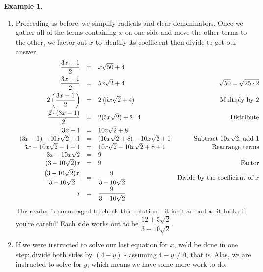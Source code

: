 \documentclass[11pt]{article}
\theoremstyle{definition}  %
\newtheorem{ex}{\bf Example}[section]
\begin{document}
\begin{ex}
\begin{enumerate}
\item  Proceeding as before, we simplify radicals and clear denominators.  Once we gather all of the terms containing $x$ on one side and move the other terms to the other, we factor out $x$ to identify its coefficient then divide to get our answer.\[ \begin{array}{rclr}

\dfrac{3x-1}{2} & = &  x\sqrt{50} + 4 & \\ [8pt]

\dfrac{3x-1}{2} & = &  5x\sqrt{2} + 4 & \text{$\sqrt{50} = \sqrt{25 \cdot 2}$} \\ [8pt]

2\left(\dfrac{3x-1}{2}\right) & = & 2 \left(5x\sqrt{2} + 4 \right) & \text{Multiply by $2$} \\ [8pt]

\dfrac{\cancel{2} \cdot (3x-1)}{\cancel{2}} & = & 2 (5x \sqrt{2}) + 2\cdot 4 & \text{Distribute} \\ [8pt]

3x - 1 & = & 10x \sqrt{2} + 8 & \\

(3x-1) - 10x\sqrt{2} + 1 & = & (10x \sqrt{2} + 8) - 10x\sqrt{2} + 1 & \text{Subtract $10x\sqrt{2}$,  add $1$} \\

3x - 10x\sqrt{2} - 1 + 1 & = & 10x\sqrt{2} - 10x\sqrt{2} + 8 + 1 & \text{Rearrange terms} \\

3x - 10x\sqrt{2} & = & 9 & \\

(3 - 10\sqrt{2}) x & = & 9 & \text{Factor} \\[3pt]

\dfrac{(3 - 10\sqrt{2}) x}{3 - 10\sqrt{2}} & = & \dfrac{9}{3 - 10\sqrt{2}} & \text{Divide by the coefficient of $x$} \\ [8pt]

x & = & \dfrac{9}{3 - 10\sqrt{2}} & \\ \end{array} \] The reader is encouraged to check this solution - it isn't as bad as it looks if you're careful! Each side works out to be $\dfrac{12 + 5\sqrt{2}}{3-10\sqrt{2}}$.

\item  If we were instructed to solve our last equation for $x$, we'd be done in one step: divide both sides by $(4-y)$ - assuming $4-y \neq 0$, that is.  Alas, we are instructed to solve for $y$, which means we have some more work to do.\[ \begin{array}{rclr}


\end{array}\]
\end{enumerate}
\end{ex}
\end{document}
